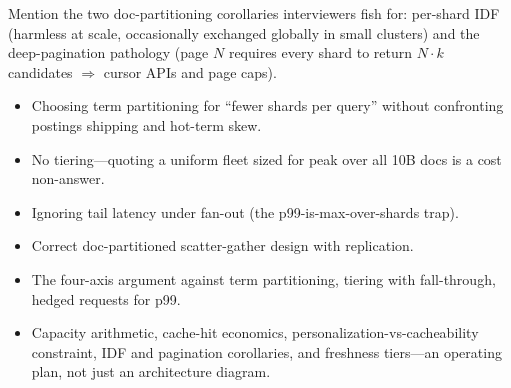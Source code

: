 \begin{interviewq}
Mention the two doc-partitioning corollaries interviewers fish for: per-shard IDF (harmless at scale, occasionally exchanged globally in small clusters) and the deep-pagination pathology (page $N$ requires every shard to return $N \cdot k$ candidates $\Rightarrow$ cursor APIs and page caps).

\redflags
\begin{itemize}
    \item Choosing term partitioning for ``fewer shards per query'' without confronting postings shipping and hot-term skew.
    \item No tiering---quoting a uniform fleet sized for peak over all 10B docs is a cost non-answer.
    \item Ignoring tail latency under fan-out (the p99-is-max-over-shards trap).
\end{itemize}


\goodgreat
\begin{itemize}
    \item {} Correct doc-partitioned scatter-gather design with replication.
    \item {} The four-axis argument against term partitioning, tiering with fall-through, hedged requests for p99.
    \item {} Capacity arithmetic, cache-hit economics, personalization-vs-cacheability constraint, IDF and pagination corollaries, and freshness tiers---an operating plan, not just an architecture diagram.
\end{itemize}

\end{interviewq}

